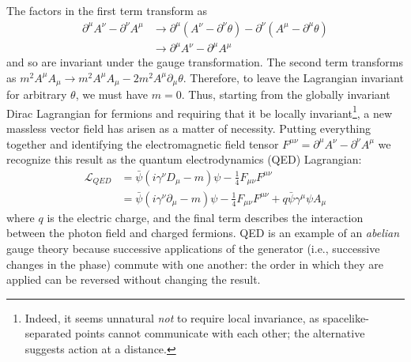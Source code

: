 The factors in the first term transform as
\begin{align}
  \partial^\mu A^\nu - \partial^\nu A^\mu
  &\rightarrow \partial^\mu (A^\nu - \partial^\nu \theta)
  - \partial^\nu (A^\mu - \partial^\mu \theta) \\
  &\rightarrow \partial^\mu A^\nu - \partial^\mu A^\mu
\end{align}
and so are invariant under the gauge transformation. The second term transforms
as $m^2A^\mu A_\mu \rightarrow m^2A^\mu A_\mu - 2 m^2 A^\mu \partial_\mu
\theta$. Therefore, to leave the Lagrangian invariant for arbitrary $\theta$, we
must have $m=0$. Thus, starting from the globally invariant Dirac Lagrangian for
fermions and requiring that it be locally invariant\footnote{Indeed, it seems
unnatural \textit{not} to require local invariance, as spacelike-separated
points cannot communicate with each other; the alternative suggests action at a
distance.}, a new massless vector field has arisen as a matter of necessity.
Putting everything together and identifying the electromagnetic field tensor
$F^{\mu\nu} = \partial^\mu A^\nu-\partial^\nu A^\mu$ we recognize this result as
the quantum electrodynamics (QED) Lagrangian:
\begin{align}
  \mathcal{L}_{QED}
    &= \bar{\psi}(i\gamma^\nu D_\mu - m)\psi
      - \frac{1}{4}F_{\mu\nu} F^{\mu\nu} \\
    &= \bar{\psi}(i\gamma^\nu \partial_\mu - m)\psi
      - \frac{1}{4}F_{\mu\nu}F^{\mu\nu}
      + q\bar{\psi}\gamma^\mu\psi A_\mu
\end{align}
where $q$ is the electric charge, and the final term describes the interaction
between the photon field and charged fermions. QED is an example of an
\textit{abelian} gauge theory because successive applications of the generator
(i.e., successive changes in the phase) commute with one another: the order in
which they are applied can be reversed without changing the result.

